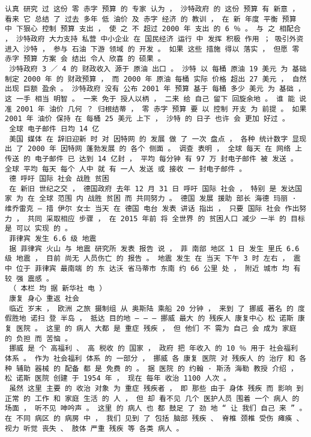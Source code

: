 \documentclass{article}
\begin{document}
\begin{Verbatim}[commandchars=\\\{\}]
 认真 研究 过 这份 零 赤字 预算 的 专家 认为 ， 沙特政府 的 这份 预算 有 新意 ， 看来 它 总结 了 过去 多年 低 油价 及 赤字 经济 的 教训 ， 在 新 年度 平衡 预算 中 下狠心 控制 预算 支出 ， 使 之 不 超过 2000 年 支出 的 6 ％ 。 与 之 相配合 ， 沙特政府 大力支持 私营 中小企业 在 国民经济 运行 中 发挥 积极 作用 ； 吸引外资 进入 沙特 ， 参与 石油 下游 领域 的 开发 。 如果 这些 措施 得以 落实 ， 但愿 零 赤字 预算 方案 会 结出 令人 欣喜 的 硕果 。 
 沙特政府 3 ／ 4 的 财政收入 源于 原油 出口 。 沙特 以 每桶 原油 19 美元 为 基础 制定 2000 年 的 财政预算 ， 而 2000 年 原油 每桶 实际 价格 超出 27 美元 ， 自然 出现 巨额 盈余 。 沙特政府 没有 公布 2001 年 预算 基于 每桶 多少 美元 为 基础 ， 这 一手 相当 明智 。 一来 免于 授人以柄 ， 二来 给 自己 留下 回旋余地 。 谁 能 说准 2001 年 油价 几何 ？ 归根结蒂 ， 零 赤字 预算 要 以 控制 开支 为 前提 。 如果 2001 年 油价 保持 在 每桶 25 美元 上下 ， 沙特 的 日子 也许 会 更加 好过 。 
 全球 电子邮件 日均 14 亿 
 美国 媒体 在 辞旧迎新 时 对 因特网 的 发展 做 了 一次 盘点 ， 各种 统计数字 显现出 了 2000 年 因特网 蓬勃发展 的 各个 侧面 。 调查 表明 ， 全球 每天 在 网络 上 传送 的 电子邮件 已 达到 14 亿封 ， 平均 每分钟 有 97 万 封电子邮件 被 发送 。 全球 平均 每天 每个 人中 就 有 一人 发送 或 接收 一 封电子邮件 。 
 德 呼吁 国际 社会 战胜 贫困 
 在 新旧 世纪之交 ， 德国政府 去年 12 月 31 日 呼吁 国际 社会 ， 特别 是 发达国家 为 在 全球 范围 内 战胜 贫困 而 共同努力 。 德国 发展 援助 部长 海德 玛丽 · 维乔雷克 — 措 伊尔 女士 当天 在 德国 电台 发表 讲话 指出 ， 只要 国际 社会 作出努力 ， 共同 采取相应 步骤 ， 在 2015 年前 将 全世界 的 贫困人口 减少 一半 的 目标 是 可以 实现 的 。 
 菲律宾 发生 6.6 级 地震 
 据 菲律宾 火山 与 地震 研究所 发表 报告 说 ， 菲 南部 地区 1 日 发生 里氏 6.6 级 地震 ， 目前 尚无 人员伤亡 的 报告 。 地震 发生 在 当天 下午 3 时 左右 ， 震中 位于 菲律宾 最南端 的 东 达沃 省马蒂市 东南 约 66 公里 处 ， 附近 城市 均 有 较 强 震感 。 
 （ 本栏 均 据 新华社 电 ） 
 康复 身心 重返 社会 
 临近 岁末 ， 欧洲 之旅 摄制组 从 奥斯陆 乘船 20 分钟 ， 来到 了 挪威 著名 的 度假胜地 诺扫 登 半岛 ， 抵达 目的地 — — — 挪威 最大 的 残疾人 康复中心 松 诺斯 康复 医院 。 这里 的 病人 大都 是 重症 残疾 ， 但 他们 不 需为 自己 会 成为 家庭 的 负担 而 苦恼 。 
 挪威 是 个 高福利 、 高 税收 的 国家 ， 政府 把 年收入 的 10 ％ 用于 社会福利 体系 。 作为 社会福利 体系 的 一部分 ， 挪威 各 康复 医院 对 残疾人 的 治疗 和 各种 辅助 器械 的 配备 都 是 免费 的 。 据 医院 的 约翰 · 斯汤 海勒 教授 介绍 ， 松 诺斯 医院 创建 于 1954 年 ， 现在 每年 收治 1100 人次 。 
 虽然 这里 主要 的 收治 对象 为 重症 残疾者 ， 即 那些 由于 身体 残疾 而 影响 到 正常 的 工作 和 家庭 生活 的 人 ， 但 却 看不见 几个 医护人员 围着 一个 病人 的 场面 ， 听不见 呻吟声 。 这里 的 病人 也 都 鼓足 了 劲 地 “ 让 我们 自己 来 ” 。 在 不同 病区 的 病房 中 ， 我们 见到 了 包括 脑部 残疾 、 脊椎 颈椎 受伤 瘫痪 、 视力 听觉 丧失 、 肢体 严重 残疾 等 各类 病人 。 

\end{Verbatim}
\end{document}
